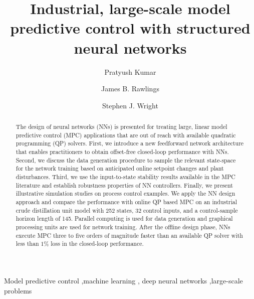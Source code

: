 \documentclass[preprint,5p, twocolumn, authoryear]{elsarticle}
\begin{document}
\begin{frontmatter}


\title{Industrial, large-scale model predictive control 
with structured neural networks}

\author[label1]{Pratyush Kumar}

\author[label1]{James B. Rawlings}

\author[label2]{Stephen J. Wright}

\address[label1]{Department of Chemical Engineering, University of California, Santa Barbara, CA 93106, United States}
\address[label2]{Computer Sciences Department, University of Wisconsin-Madison, Madison, WI 53706, United States}

\begin{abstract}
The design of neural networks (NNs) is presented 
for treating large, linear model predictive control (MPC) applications that 
are out of reach with available quadratic programming (QP)
solvers. First, we introduce a new feedforward
network architecture that enables practitioners to 
obtain offset-free closed-loop performance with NNs.
Second, we discuss the data generation procedure 
to sample the relevant state-space for the network 
training based on anticipated online setpoint changes and
plant disturbances. Third, we use the 
input-to-state stability results 
available in the MPC literature
and establish robustness 
properties of NN controllers.
Finally, we present illustrative
simulation studies on 
process control examples. 
We apply the NN design approach
and compare the performance with online QP based MPC on an industrial crude
distillation unit model with 252 states, 32 control inputs, 
and a control-sample horizon length of 145. Parallel computing 
is used for data generation and graphical processing units are used for
network training. 
After the offline design phase, 
NNs execute MPC 
three to five orders of magnitude faster
than an available QP solver with less than $1\%$
loss in the closed-loop performance.
\end{abstract}

\begin{keyword}
Model predictive control \sep machine learning \sep 
deep neural networks \sep large-scale problems
\end{keyword}

\end{frontmatter}
\end{document}

